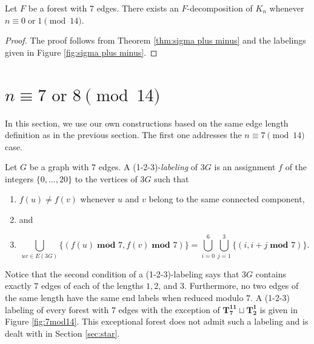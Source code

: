 \documentclass{dmgt}
\begin{document}


\begin{theorem}\label{thm:0 or 1 mod 14}
    Let $F$ be a forest with $7$ edges. There exists an $F$-decomposition of $K_n$ whenever $n \equiv 0 \; \textrm{or} \; 1 \pmod{14}.$
\end{theorem}
\begin{proof}
    The proof follows from Theorem \ref{thm:sigma plus minus} and the labelings given in Figure \ref{fig:sigma plus minus}.
\end{proof}
\newpage
\section{$n \equiv 7 \textrm{ or } 8 \pmod{14}$} \label{sec:7 or 8 mod 14}
In this section, we use our own constructions based on the same edge length definition as in the previous section. The first one addresses the $n \equiv 7 \pmod{14}$ case.

\begin{dnt}\label{def:1-2-3}
    Let $G$ be a graph with $7$ edges. A (1-2-3)-\emph{labeling} of $3G$ is an assignment $f$ of the integers $\{0,\dots,20\}$ to the vertices of $3G$ such that
    \begin{enumerate}
        \item $f(u) \neq f(v)$ whenever $u$ and $v$ belong to the same connected component, 
        \item[] and
        \item $$ \bigcup_{uv\in E(3G)} \{(f(u)\; \textbf{mod } 7,f(v)\; \textbf{mod } 7)\}= \bigcup_{i=0}^{6} \bigcup_{j=1}^{3} \{(i,i+j \; \textbf{mod } 7)\}.$$
    \end{enumerate}
\end{dnt}
Notice that the second condition of a (1-2-3)-labeling says that $3G$ contains exactly $7$ edges of each of the lengths $1,2$, and $3$. Furthermore, no two edges of the same length have the same end labels when reduced modulo $7.$ A (1-2-3) labeling of every forest with $7$ edges with the exception of $\mathbf{T_{7}^{11}}\sqcup\mathbf{T_{2}^{1}}$ is given in Figure \ref{fig:7mod14}. This exceptional forest does not admit such a labeling and is dealt with in Section \ref{sec:star}.
\end{document}
